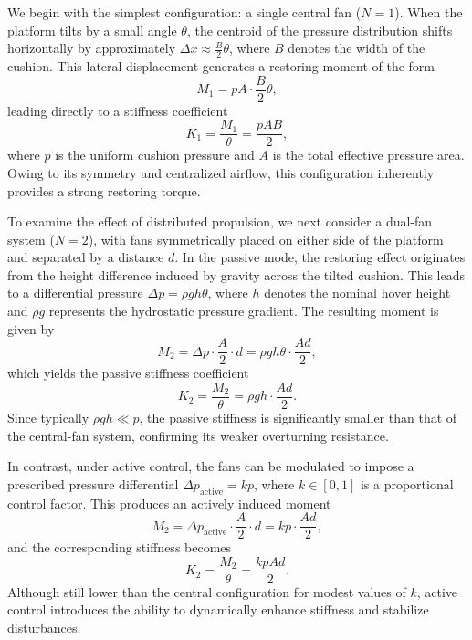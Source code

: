 We begin with the simplest configuration: a single central fan (\( N=1 \)). When the platform tilts by a small angle \( \theta \), the centroid of the pressure distribution shifts horizontally by approximately \( \Delta x \approx \frac{B}{2} \theta \), where \( B \) denotes the width of the cushion. This lateral displacement generates a restoring moment of the form
\begin{equation}
    M_1 = p A \cdot \frac{B}{2} \theta,
\end{equation}
leading directly to a stiffness coefficient
\begin{equation}
    K_1 = \frac{M_1}{\theta} = \frac{p A B}{2},
\end{equation}
where \( p \) is the uniform cushion pressure and \( A \) is the total effective pressure area. Owing to its symmetry and centralized airflow, this configuration inherently provides a strong restoring torque.

To examine the effect of distributed propulsion, we next consider a dual-fan system (\( N=2 \)), with fans symmetrically placed on either side of the platform and separated by a distance \( d \). In the passive mode, the restoring effect originates from the height difference induced by gravity across the tilted cushion. This leads to a differential pressure \( \Delta p = \rho g h \theta \), where \( h \) denotes the nominal hover height and \( \rho g \) represents the hydrostatic pressure gradient. The resulting moment is given by
\begin{equation}
    M_2 = \Delta p \cdot \frac{A}{2} \cdot d = \rho g h \theta \cdot \frac{A d}{2},
\end{equation}
which yields the passive stiffness coefficient
\begin{equation}
    K_2 = \frac{M_2}{\theta} = \rho g h \cdot \frac{A d}{2}.
\end{equation}
Since typically \( \rho g h \ll p \), the passive stiffness is significantly smaller than that of the central-fan system, confirming its weaker overturning resistance.

In contrast, under active control, the fans can be modulated to impose a prescribed pressure differential \( \Delta p_{\text{active}} = k p \), where \( k \in [0,1] \) is a proportional control factor. This produces an actively induced moment
\begin{equation}
    M_2 = \Delta p_{\text{active}} \cdot \frac{A}{2} \cdot d = k p \cdot \frac{A d}{2},
\end{equation}
and the corresponding stiffness becomes
\begin{equation}
    K_2 = \frac{M_2}{\theta} = \frac{k p A d}{2}.
\end{equation}
Although still lower than the central configuration for modest values of \( k \), active control introduces the ability to dynamically enhance stiffness and stabilize disturbances. 

